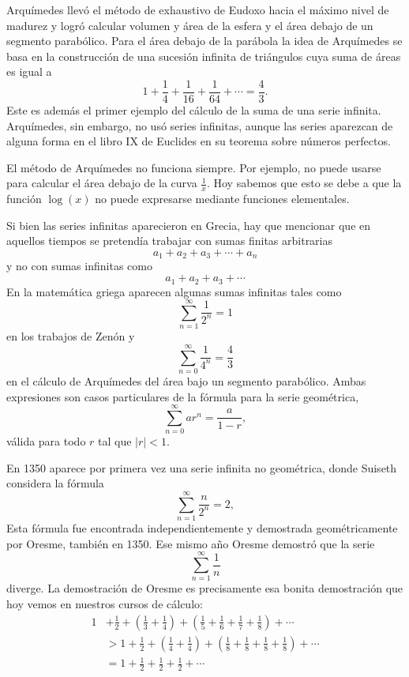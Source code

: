 Arquímedes llevó el método de exhaustivo de Eudoxo hacia el máximo nivel de
madurez y logró calcular volumen y área de la esfera y el área debajo de un
segmento parabólico. Para el área debajo de la parábola la idea de Arquímedes 
se basa en la construcción de una sucesión infinita de triángulos cuya suma 
de áreas es igual a 
\[
	1+\frac14+\frac{1}{16}+\frac{1}{64}+\cdots=\frac43.
\]
Este es además el primer ejemplo del cálculo de la suma de una serie infinita.
Arquímedes, sin embargo, no usó series infinitas, aunque las series aparezcan
de alguna forma en el libro IX de Euclides en su teorema sobre números
perfectos. 

El método de Arquímedes no funciona siempre. Por ejemplo, no puede usarse para
calcular el área debajo de la curva $\frac{1}{x}$. Hoy sabemos que esto se debe
a que la función $\log(x)$ no puede expresarse mediante funciones elementales.

Si bien las series infinitas aparecieron en Grecia, hay que mencionar que en
aquellos tiempos se pretendía trabajar con sumas finitas arbitrarias 
\[
	a_1+a_2+a_3+\cdots+a_n
\]
y no con sumas infinitas como 
\[
	a_1+a_2+a_3+\cdots
\]
En la matemática griega aparecen algunas sumas infinitas tales como
\[
	\sum_{n=1}^\infty\frac{1}{2^n}=1
\]
en los trabajos de Zenón y  
\[
	\sum_{n=0}^\infty\frac{1}{4^n}=\frac43
\]
en el cálculo de Arquímedes del área bajo un segmento parabólico. Ambas
expresiones son casos particulares de la fórmula para la serie geométrica, 
\[
	\sum_{n=0}^\infty ar^n=\frac{a}{1-r},
\]
válida para todo $r$ tal que $|r|<1$. 

En 1350 aparece por primera vez una serie infinita no geométrica, donde Suiseth
considera la fórmula
\[
	\sum_{n=1}^\infty\frac{n}{2^n}=2,
\]
Esta fórmula fue encontrada independientemente y demostrada geométricamente por
Oresme, también en 1350. Ese mismo año Oresme demostró que la serie 
\[
	\sum_{n=1}^\infty\frac1n
\]
diverge. La demostración de Oresme es precisamente esa bonita demostración que
hoy vemos en nuestros cursos de cálculo:
\begin{align*}
	1&+\frac12+\left(\frac13+\frac14\right)+\left(\frac15+\frac16+\frac17+\frac18\right)+\cdots\\
	&>1+\frac12+\left(\frac14+\frac14\right)+\left(\frac18+\frac18+\frac18+\frac18\right)+\cdots\\
	&=1+\frac12+\frac12+\frac12+\cdots
\end{align*}

